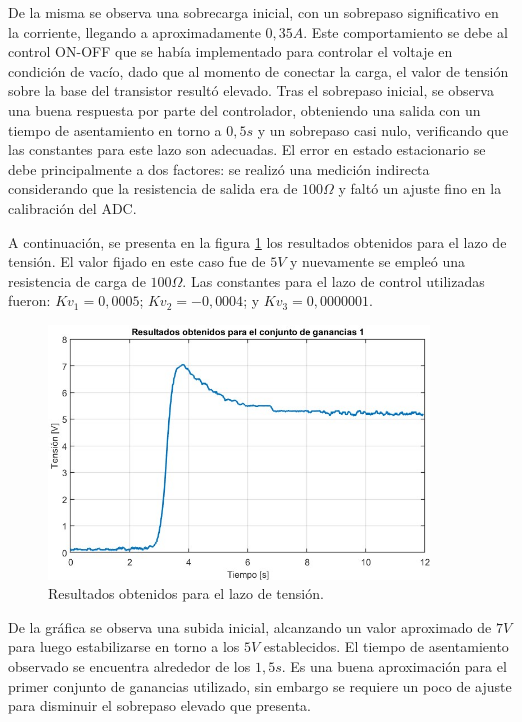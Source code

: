 De la misma se observa una sobrecarga inicial, con un sobrepaso significativo en la corriente, llegando a aproximadamente $0,35A$. Este comportamiento se debe al control ON-OFF que se había implementado para controlar el voltaje en condición de vacío, dado que al momento de conectar la carga, el valor de tensión sobre la base del transistor resultó elevado. Tras el sobrepaso inicial, se observa una buena respuesta por parte del controlador, obteniendo una salida con un tiempo de asentamiento en torno a $0,5s$ y un sobrepaso casi nulo, verificando que las constantes para este lazo son adecuadas. El error en estado estacionario se debe principalmente a dos factores: se realizó una medición indirecta considerando que la resistencia de salida era de $100\Omega$ y faltó un ajuste fino en la calibración del ADC.\par 
A continuación, se presenta en la figura \ref{F:Resultados obtenidos para el lazo de tensión} los resultados obtenidos para el lazo de tensión. El valor fijado en este caso fue de $5V$ y nuevamente se empleó una resistencia de carga de $100\Omega$. Las constantes para el lazo de control utilizadas fueron: $Kv_1=0,0005$; $Kv_2=-0,0004$; y $Kv_3=0,0000001$.
\begin{figure}[htbp]
    \centering
    \includegraphics[width=0.9\textwidth]{./imagenes/NF3_tension_salida.jpg}
    \caption{Resultados obtenidos para el lazo de tensión.}
    \label{F:Resultados obtenidos para el lazo de tensión}
\end{figure}\par 
De la gráfica se observa una subida inicial, alcanzando un valor aproximado de $7V$para luego estabilizarse en torno a los $5V$ establecidos. El tiempo de asentamiento observado se encuentra alrededor de los $1,5s$. Es una buena aproximación para el primer conjunto de ganancias utilizado, sin embargo se requiere un poco de ajuste para disminuir el sobrepaso elevado que presenta.\par 


